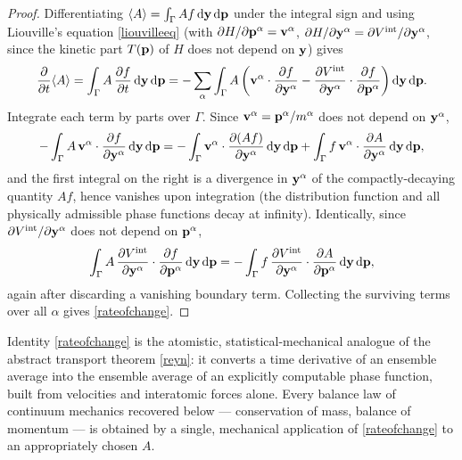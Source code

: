 \begin{proof}
	Differentiating $\langle A\rangle=\int_\Gamma Af\,\mathrm{d}\mathbf{y}\,\mathrm{d}\mathbf{p}$ under the integral sign and using Liouville's equation \eqref{liouvilleeq} (with $\partial H/\partial\mathbf{p}^\alpha=\mathbf{v}^\alpha$, $\partial H/\partial\mathbf{y}^\alpha=\partial V^{\rm int}/\partial\mathbf{y}^\alpha$, since the kinetic part $T(\mathbf{p})$ of $H$ does not depend on $\mathbf{y}$) gives
	\begin{equation}
		\frac{\partial}{\partial t}\langle A\rangle = \int_\Gamma A\,\frac{\partial f}{\partial t}\,\mathrm{d}\mathbf{y}\,\mathrm{d}\mathbf{p} = -\sum_\alpha\int_\Gamma A\left(\mathbf{v}^\alpha\cdot\frac{\partial f}{\partial\mathbf{y}^\alpha} - \frac{\partial V^{\rm int}}{\partial\mathbf{y}^\alpha}\cdot\frac{\partial f}{\partial\mathbf{p}^\alpha}\right)\mathrm{d}\mathbf{y}\,\mathrm{d}\mathbf{p}.
	\end{equation}
	Integrate each term by parts over $\Gamma$. Since $\mathbf{v}^\alpha=\mathbf{p}^\alpha/m^\alpha$ does not depend on $\mathbf{y}^\alpha$,
	\begin{equation}
		-\int_\Gamma A\,\mathbf{v}^\alpha\cdot\frac{\partial f}{\partial\mathbf{y}^\alpha}\,\mathrm{d}\mathbf{y}\,\mathrm{d}\mathbf{p} = -\int_\Gamma \mathbf{v}^\alpha\cdot\frac{\partial(Af)}{\partial\mathbf{y}^\alpha}\,\mathrm{d}\mathbf{y}\,\mathrm{d}\mathbf{p} + \int_\Gamma f\,\mathbf{v}^\alpha\cdot\frac{\partial A}{\partial\mathbf{y}^\alpha}\,\mathrm{d}\mathbf{y}\,\mathrm{d}\mathbf{p},
	\end{equation}
	and the first integral on the right is a divergence in $\mathbf{y}^\alpha$ of the compactly-decaying quantity $Af$, hence vanishes upon integration (the distribution function and all physically admissible phase functions decay at infinity). Identically, since $\partial V^{\rm int}/\partial\mathbf{y}^\alpha$ does not depend on $\mathbf{p}^\alpha$,
	\begin{equation}
		\int_\Gamma A\,\frac{\partial V^{\rm int}}{\partial\mathbf{y}^\alpha}\cdot\frac{\partial f}{\partial\mathbf{p}^\alpha}\,\mathrm{d}\mathbf{y}\,\mathrm{d}\mathbf{p} = -\int_\Gamma f\,\frac{\partial V^{\rm int}}{\partial\mathbf{y}^\alpha}\cdot\frac{\partial A}{\partial\mathbf{p}^\alpha}\,\mathrm{d}\mathbf{y}\,\mathrm{d}\mathbf{p},
	\end{equation}
	again after discarding a vanishing boundary term. Collecting the surviving terms over all $\alpha$ gives \eqref{rateofchange}.
\end{proof}

\begin{remark}
	Identity \eqref{rateofchange} is the atomistic, statistical-mechanical analogue of the abstract transport theorem \eqref{reyn}: it converts a time derivative of an ensemble average into the ensemble average of an explicitly computable phase function, built from velocities and interatomic forces alone. Every balance law of continuum mechanics recovered below --- conservation of mass, balance of momentum --- is obtained by a single, mechanical application of \eqref{rateofchange} to an appropriately chosen $A$.
\end{remark}

